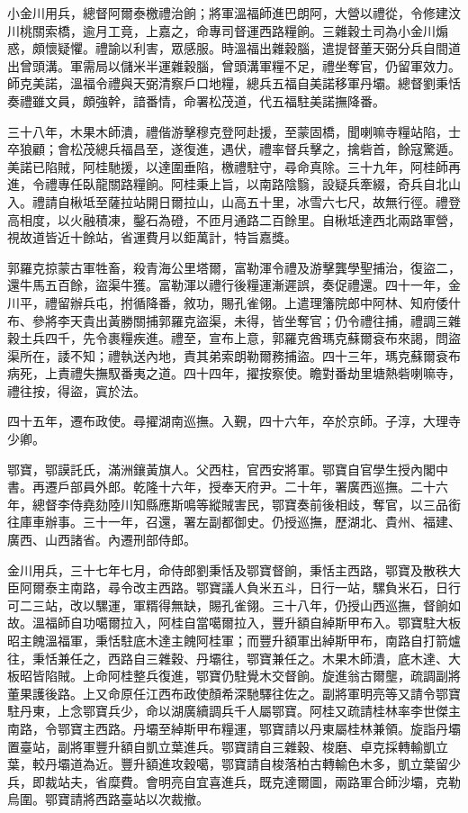 \begin{pinyinscope}
小金川用兵，總督阿爾泰檄禮治餉；將軍溫福師進巴朗阿，大營以禮從，令修建汶川桃關索橋，逾月工竟，上嘉之，命專司督運西路糧餉。三雜穀土司為小金川煽惑，頗懷疑懼。禮諭以利害，眾感服。時溫福出雜穀腦，遣提督董天弼分兵自間道出曾頭溝。軍需局以儲米半運雜穀腦，曾頭溝軍糧不足，禮坐奪官，仍留軍效力。師克美諾，溫福令禮與天弼清察戶口地糧，總兵五福自美諾移軍丹壩。總督劉秉恬奏禮雖文員，頗強幹，諳番情，命署松茂道，代五福駐美諾撫降番。

三十八年，木果木師潰，禮偕游擊穆克登阿赴援，至蒙固橋，聞喇嘛寺糧站陷，士卒狼顧；會松茂總兵福昌至，遂復進，遇伏，禮率督兵擊之，擒砦首，餘寇驚遁。美諾已陷賊，阿桂馳援，以達圍垂陷，檄禮駐守，尋命真除。三十九年，阿桂師再進，令禮專任臥龍關路糧餉。阿桂秉上旨，以南路陰翳，設疑兵牽綴，奇兵自北山入。禮請自楸坻至薩拉站開日爾拉山，山高五十里，冰雪六七尺，故無行徑。禮登高相度，以火融積凍，鑿石為磴，不匝月通路二百餘里。自楸坻達西北兩路軍營，視故道皆近十餘站，省運費月以鉅萬計，特旨嘉獎。

郭羅克掠蒙古軍牲畜，殺青海公里塔爾，富勒渾令禮及游擊龔學聖捕治，復盜二，還牛馬五百餘，盜渠牛獲。富勒渾以禮行後糧運漸遲誤，奏促禮還。四十一年，金川平，禮留辦兵屯，拊循降番，敘功，賜孔雀翎。上遣理籓院郎中阿林、知府倭什布、參將李天貴出黃勝關捕郭羅克盜渠，未得，皆坐奪官；仍令禮往捕，禮調三雜穀土兵四千，先令裹糧疾進。禮至，宣布上意，郭羅克酋瑪克蘇爾袞布來謁，問盜渠所在，諉不知；禮執送內地，責其弟索朗勒爾務捕盜。四十三年，瑪克蘇爾袞布病死，上責禮失撫馭番夷之道。四十四年，擢按察使。瞻對番劫里塘熱砦喇嘛寺，禮往按，得盜，寘於法。

四十五年，遷布政使。尋擢湖南巡撫。入覲，四十六年，卒於京師。子淳，大理寺少卿。

鄂寶，鄂謨託氏，滿洲鑲黃旗人。父西柱，官西安將軍。鄂寶自官學生授內閣中書。再遷戶部員外郎。乾隆十六年，授奉天府尹。二十年，署廣西巡撫。二十六年，總督李侍堯劾陸川知縣應斯鳴等縱賊害民，鄂寶奏前後相歧，奪官，以三品銜往庫車辦事。三十一年，召還，署左副都御史。仍授巡撫，歷湖北、貴州、福建、廣西、山西諸省。內遷刑部侍郎。

金川用兵，三十七年七月，命侍郎劉秉恬及鄂寶督餉，秉恬主西路，鄂寶及散秩大臣阿爾泰主南路，尋令改主西路。鄂寶議人負米五斗，日行一站，騾負米石，日行可二三站，改以騾運，軍糈得無缺，賜孔雀翎。三十八年，仍授山西巡撫，督餉如故。溫福師自功噶爾拉入，阿桂自當噶爾拉入，豐升額自綽斯甲布入。鄂寶駐大板昭主餽溫福軍，秉恬駐底木達主餽阿桂軍；而豐升額軍出綽斯甲布，南路自打箭爐往，秉恬兼任之，西路自三雜穀、丹壩往，鄂寶兼任之。木果木師潰，底木達、大板昭皆陷賊。上命阿桂整兵復進，鄂寶仍駐覺木交督餉。旋進翁古爾壟，疏調副將董果護後路。上又命原任江西布政使顏希深馳驛往佐之。副將軍明亮等又請令鄂寶駐丹東，上念鄂寶兵少，命以湖廣續調兵千人屬鄂寶。阿桂又疏請桂林率李世傑主南路，令鄂寶主西路。丹壩至綽斯甲布糧運，鄂寶請以丹東屬桂林兼領。旋詣丹壩置臺站，副將軍豐升額自凱立葉進兵。鄂寶請自三雜穀、梭磨、卓克採轉輸凱立葉，較丹壩道為近。豐升額進攻穀噶，鄂寶請自梭落柏古轉輸色木多，凱立葉留少兵，即裁站夫，省糜費。會明亮自宜喜進兵，既克達爾圖，兩路軍合師沙壩，克勒烏圍。鄂寶請將西路臺站以次裁撤。


\end{pinyinscope}

